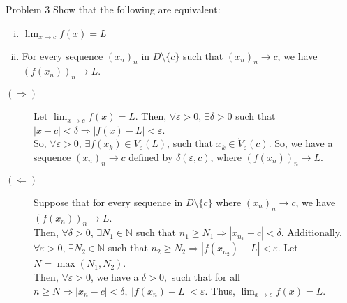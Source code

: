 \documentclass[10pt]{extarticle}
\newcommand{\N}{\mathbb{N}}
\begin{document}
  \begin{problem}{Problem 3}
    Show that the following are equivalent:
    \begin{enumerate}[(i)]
      \item $\lim_{x\rightarrow c} f(x) = L$
      \item For every sequence $(x_n)_n$ in $D\setminus \{c\}$ such that $(x_n)_n \rightarrow c$, we have $(f(x_n))_n \rightarrow L$. 
    \end{enumerate}
    \tcblower
    \begin{description}
      \item[$(\Rightarrow)$] Let $\lim_{x\rightarrow c} f(x) = L$. Then, $\forall \varepsilon > 0$, $\exists \delta > 0$ such that $|x-c| < \delta \Rightarrow |f(x) - L| < \varepsilon$.\\

        So, $\forall \varepsilon > 0$, $\exists f(x_k) \in V_{\varepsilon}(L)$, such that $x_k\in \dot{V}_{\varepsilon}(c)$. So, we have a sequence $(x_n)_n \rightarrow c$ defined by $\delta(\varepsilon, c)$, where $\left(f(x_n)\right)_n \rightarrow L$.
      \item[$(\Leftarrow)$] Suppose that for every sequence in $D\setminus \{c\}$ where $(x_n)_n \rightarrow c$, we have $(f(x_n))_n \rightarrow L$.\\

        Then, $\forall \delta > 0$, $\exists N_1 \in \N$ such that $n_1 \geq N_1 \Rightarrow \left|x_{n_1} - c\right| < \delta$. Additionally, $\forall \varepsilon > 0$, $\exists N_2 \in \N$ such that $n_2 \geq N_2 \Rightarrow \left|f\left(x_{n_2}\right) - L\right| < \varepsilon$. Let $N = \max(N_1,N_2)$.\\

        Then, $\forall \varepsilon > 0$, we have a $\delta > 0,$ such that for all $n\geq N \Rightarrow \left|x_n - c\right| < \delta,~\left|f(x_n) - L\right| < \varepsilon$. Thus, $\lim_{x\rightarrow c}f(x) = L$.
    \end{description}
  \end{problem}
\end{document}
